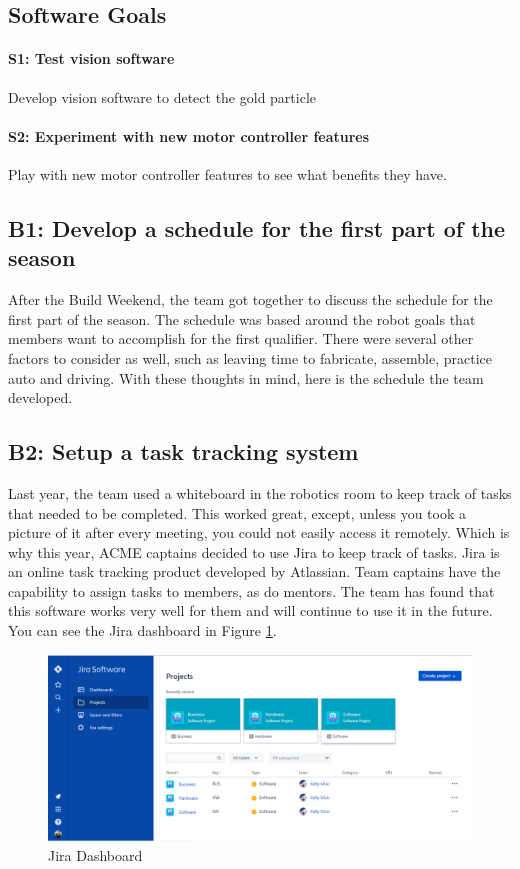\documentclass{article}
\begin{document}
\subsection{Software Goals}
\paragraph{S1: Test vision software}
 Develop vision software to detect the gold particle
\paragraph{S2: Experiment with new motor controller features}
 Play with new motor controller features to see what benefits they have.
\newpage
\subsection{B1: Develop a schedule for the first part of the season}

After the Build Weekend, the team got together to discuss the schedule for the first part of the season. The schedule was based around the robot goals that members want to accomplish for the first qualifier. There were several other factors to consider as well, such as leaving time to fabricate, assemble, practice auto and driving. With these thoughts in mind, here is the schedule the team developed. 

\subsection{B2: Setup a task tracking system}

Last year, the team used a whiteboard in the robotics room to keep track of tasks that needed to be completed. This worked great, except, unless you took a picture of it after every meeting, you could not easily access it remotely. Which is why this year, ACME captains decided to use Jira to keep track of tasks. Jira is an online task tracking product developed by Atlassian. Team captains have the capability to assign tasks to members, as do mentors. The team has found that this software works very well for them and will continue to use it in the future. You can see the Jira dashboard in Figure \ref{fig:jiradash}.

\begin{figure}
    \centering
    \includegraphics[width=.6\textwidth]{02_09-10/images/jiradash.png}
    \caption{Jira Dashboard}
    \label{fig:jiradash}
\end{figure}
\end{document}

